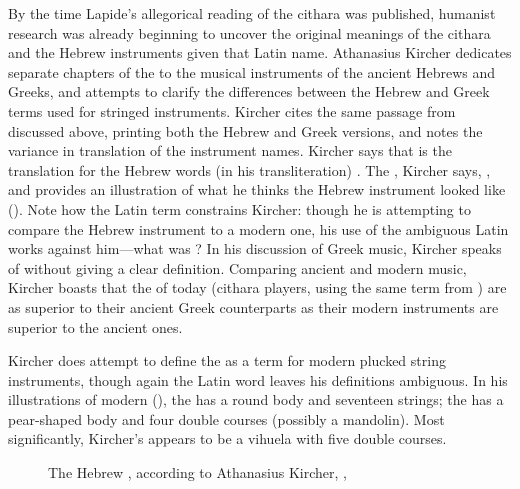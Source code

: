 By the time Lapide's allegorical reading of the cithara was published, humanist
research was already beginning to uncover the original meanings of the cithara
and the Hebrew instruments given that Latin name.
Athanasius Kircher dedicates separate chapters of the  to the
musical instruments of the ancient Hebrews and Greeks, and attempts to clarify
the differences between the Hebrew and Greek terms used for stringed
instruments.
Kircher cites the same passage from  discussed above,
printing both the Hebrew and Greek versions, and notes the variance in
translation of the instrument names.
Kircher says that  is the translation for the Hebrew words (in
his transliteration) .
The , Kircher says, , and provides an illustration of what he thinks
the Hebrew instrument looked like ().%
    \autocite[, 44--49]{Kircher:Musurgia} 
Note how the Latin term constrains Kircher: though he is attempting to compare
the Hebrew instrument to a modern one, his use of the ambiguous Latin
 works against him---what was ?
In his discussion of Greek music, Kircher speaks of  without
giving a clear definition.
Comparing ancient and modern music, Kircher boasts that the
 of today (cithara players, using the same term from
) are as superior to their ancient Greek counterparts as
their modern instruments are superior to the ancient ones.%
    \Autocite[, 548]{Kircher:Musurgia}


Kircher does attempt to define the  as a term for modern
plucked string instruments, though again the Latin word leaves his definitions
ambiguous.
In his illustrations of modern 
(), the  has a round body and
seventeen strings; the  has a pear-shaped
body and four double courses (possibly a mandolin).
Most significantly, Kircher's  appears to be a vihuela
with five double courses.

\begin{figure}
    \caption{The Hebrew , according to Athanasius Kircher,
    , }
    \label{fig:Kircher-kinnor}
\end{figure}

